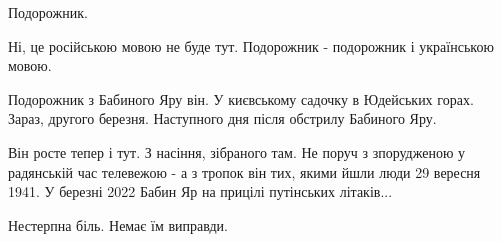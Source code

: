 Подорожник.

Ні, це російською мовою не буде тут. Подорожник - подорожник і українською мовою. 

Подорожник з Бабиного Яру він. У києвському садочку в Юдейських горах. Зараз,
другого березня. Наступного дня після обстрилу Бабиного Яру.

Він росте тепер і тут. З насіння, зібраного там. Не поруч з зпорудженою у
радянській час телевежою - а з тропок він тих, якими йшли люди 29 вересня 1941.
У березні 2022 Бабин Яр на прицілі путінських літаків...

Нестерпна біль. Немає їм виправди.

